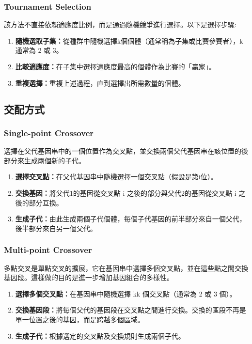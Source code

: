 \subsubsection{Tournament Selection}
該方法不直接依賴適應度比例，而是通過隨機競爭進行選擇。以下是選擇步驟:
\begin{enumerate}
    \item \textbf{隨機選取子集：}從種群中隨機選擇k個個體（通常稱為子集或比賽參賽者），k通常為 2 或 3。
    \item \textbf{比較適應度：}在子集中選擇適應度最高的個體作為比賽的「贏家」。
    \item \textbf{重複選擇：}重複上述過程，直到選擇出所需數量的個體。
\end{enumerate}

\subsection{交配方式}
\subsubsection{Single-point Crossover}
選擇在父代基因串中的一個位置作為交叉點，並交換兩個父代基因串在該位置的後部分來生成兩個新的子代。
\begin{enumerate}
    \item \textbf{選擇交叉點：}在父代基因串中隨機選擇一個交叉點（假設是第i位）。
    \item \textbf{交換基因：}將父代1的基因從交叉點 i 之後的部分與父代2的基因從交叉點 i 之後的部分互換。
    \item \textbf{生成子代：}由此生成兩個子代個體，每個子代基因的前半部分來自一個父代，後半部分來自另一個父代。
\end{enumerate}
\subsubsection{Multi-point Crossover}
多點交叉是單點交叉的擴展，它在基因串中選擇多個交叉點，並在這些點之間交換基因段。這樣做的目的是進一步增加基因組合的多樣性。
\begin{enumerate}
    \item \textbf{選擇多個交叉點：}在基因串中隨機選擇 kk 個交叉點（通常為 2 或 3 個）。
    \item \textbf{交換基因段：}將每個父代的基因段在交叉點之間進行交換。交換的區段不再是單一位置之後的基因，而是跨越多個區域。
    \item \textbf{生成子代：}根據選定的交叉點及交換規則生成兩個子代。
\end{enumerate}



